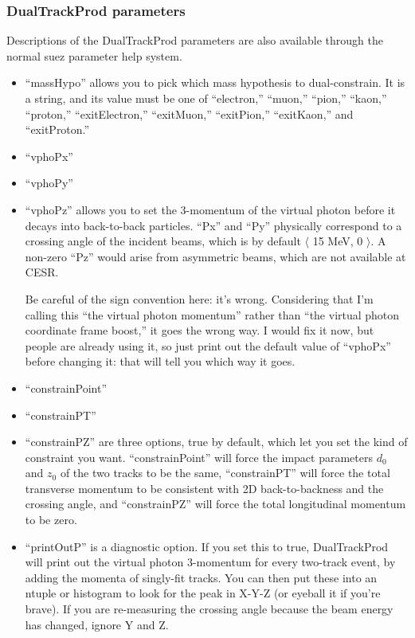 \documentclass[12pt]{article}
\begin{document}
\subsubsection{DualTrackProd parameters}

Descriptions of the DualTrackProd parameters are also available
through the normal suez parameter help system.

\begin{itemize}

  \item ``massHypo'' allows you to pick which mass hypothesis to
  dual-constrain.  It is a string, and its value must be one of
  ``electron,'' ``muon,'' ``pion,'' ``kaon,'' ``proton,''
  ``exitElectron,'' ``exitMuon,'' ``exitPion,'' ``exitKaon,'' and
  ``exitProton.''

\pagebreak

  \item ``vphoPx''
  \item ``vphoPy''
  \item ``vphoPz'' allows you to set the 3-momentum of the virtual
  photon before it decays into back-to-back particles.  ``Px'' and
  ``Py'' physically correspond to a crossing angle of the incident
  beams, which is by default $\langle$ 15 MeV, 0 $\rangle$.  A
  non-zero ``Pz'' would arise from asymmetric beams, which are not
  available at CESR.

  Be careful of the sign convention here: it's wrong.  Considering
  that I'm calling this ``the virtual photon momentum'' rather than
  ``the virtual photon coordinate frame boost,'' it goes the wrong
  way.  I would fix it now, but people are already using it, so just
  print out the default value of ``vphoPx'' before changing it: that
  will tell you which way it goes.

  \item ``constrainPoint''
  \item ``constrainPT''
  \item ``constrainPZ'' are three options, true by default, which let
  you set the kind of constraint you want.  ``constrainPoint'' will
  force the impact parameters $d_0$ and $z_0$ of the two tracks to be
  the same, ``constrainPT'' will force the total transverse momentum
  to be consistent with 2D back-to-backness and the crossing angle,
  and ``constrainPZ'' will force the total longitudinal momentum to be
  zero.

  \item ``printOutP'' \label{printOutP} is a diagnostic option.  If
  you set this to true, DualTrackProd will print out the virtual
  photon 3-momentum for every two-track event, by adding the momenta
  of singly-fit tracks.  You can then put these into an ntuple or
  histogram to look for the peak in X-Y-Z (or eyeball it if you're
  brave).  If you are re-measuring the crossing angle because the beam
  energy has changed, ignore Y and Z.

\end{itemize}
\end{document}
